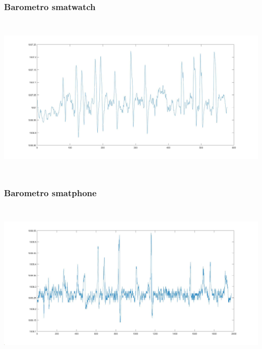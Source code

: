 \documentclass[a4paper]{article}
\begin{document}
\subsubsection{Barometro smatwatch\\} 
\begin{minipage}{\linewidth}
\begin{center}
\includegraphics[width=160mm, height= 80mm]{./images/registrazione_tesi/pressure_phone.jpg} 
\end{center}
\end{minipage}
\makebox[\linewidth]{}
\makebox[\linewidth]{}\makebox[\linewidth]{}\makebox[\linewidth]{}
\makebox[\linewidth]{}\makebox[\linewidth]{}\makebox[\linewidth]{}
\makebox[\linewidth]{}\makebox[\linewidth]{}\makebox[\linewidth]{}
\makebox[\linewidth]{}\makebox[\linewidth]{}\makebox[\linewidth]{}

\subsubsection{Barometro smatphone\\} 
\makebox[\linewidth]{}
\begin{minipage}{\linewidth}
\begin{center}
\includegraphics[width=160mm, height= 80mm]{./images/registrazione_tesi/pressure_watch.jpg} 
\end{center}
\end{minipage}
\end{document}
